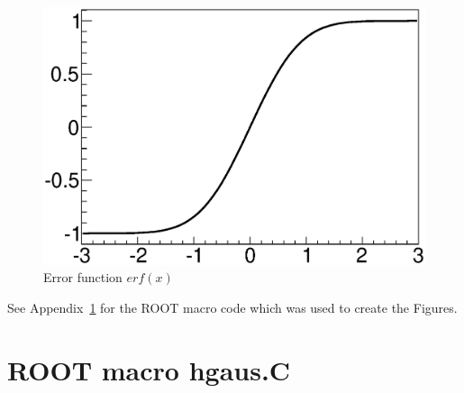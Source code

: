 \documentclass[english]{article}
\makeatletter
\def\ScaleIfNeeded{%
\ifdim\Gin@nat@width>\linewidth
\linewidth
\else
\Gin@nat@width
\fi
}
\makeatother
\begin{document}
\begin{figure}[h]
\centering
\begin{minipage}[t]{0.75 \linewidth}
\includegraphics[width=\ScaleIfNeeded]{erf.eps}
\caption{Error function $erf(x)$}
\label{fig:erf}
\end{minipage}
\end{figure}

See Appendix~\ref{app:code_hgaus.C} for the ROOT macro code which was used to create the Figures.


\appendix

\section{ROOT macro hgaus.C}
\label{app:code_hgaus.C}





\end{document}
